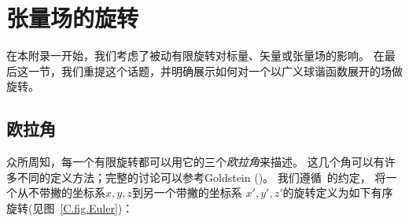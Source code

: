 \section{张量场的旋转}
%
\label{C.sec.rotate}

在本附录一开始，我们考虑了被动有限旋转对标量、矢量或张量场的影响。
在最后这一节，我们重提这个话题，并明确展示如何对一个以广义球谐函数展开的场做旋转。

\subsection{欧拉角}
%
\label{C.sec.Euler}

众所周知，每一个有限旋转都可以用它的三个{\em 欧拉角\/}来描述。
这几个角可以有许多不同的定义方法；完整的讨论可以参考Goldstein (\citeyear{goldstein80})。
我们遵循~\textcite{edmonds60}的约定，
将一个从不带撇的坐标系$x,y,z$到另一个带撇的坐标系 $x',y',z'$的旋转定义为如下有序旋转(见图~\ref{C.fig.Euler})：

